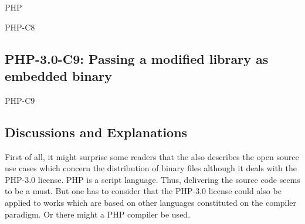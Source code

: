 \begin{license}{PHP}
\begin{lsuc}{PHP-C8}
  \begin{lsucprohibits}
    \lsucitem{\toUseTheNamePHP}
  \end{lsucprohibits}
\end{lsuc}

\subsection{PHP-3.0-C9: Passing a modified library as embedded binary}
\begin{lsuc}{PHP-C9}



  \begin{lsucrequires}
    \lsucmandatory{\acknowledgePHPInDocumentation}
    \lsucmandatory{\addLicenseToDocumentation}
    \lsucoptional{\reproducePHPLicense}
    \lsucoptional{\markUndistributedModifications}
    \lsucoptional{\keepBinarySeparate}
  \end{lsucrequires}

  \begin{lsucprohibits}
    \lsucitem{\toUseTheNamePHP}
  \end{lsucprohibits}
\end{lsuc}

\subsection{Discussions and Explanations}
\label{sec:PhpDiscussions}

First of all, it might surprise some readers that the \oslic{} also describes
the open source use cases which concern the distribution of binary files
although it deals with the PHP-3.0 license. PHP is a script language. Thus,
delivering the source code seems to be a must. But one has to consider that the
PHP-3.0 license could also be applied to works which are based on other
languages constituted on the compiler paradigm. Or there might a PHP compiler be
used. 


\end{license}
